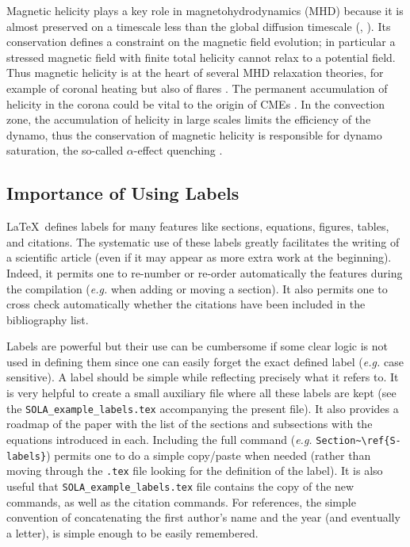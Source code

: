 \documentclass[namedreferences]{solarphysics}
\begin{document}
\begin{article}
Magnetic helicity plays a key role in magnetohydrodynamics (MHD)
because it is almost preserved on a timescale less than the global
diffusion timescale (\citealp{Berger84}, \citeyear{Berger03}).  
Its conservation defines a
constraint on the magnetic field evolution; in particular a
stressed magnetic field with finite total helicity cannot relax to
a potential field.  Thus magnetic helicity is at the heart of
several MHD relaxation theories, for example of coronal heating
\citep{Heyvaerts84} but also of flares \citep{Kusano04,Melrose04}.
The permanent accumulation of helicity in the corona could be
vital to the origin of CMEs \citep{Rust94,Low97}.  In the
convection zone, the accumulation of helicity in large scales
limits the efficiency of the dynamo, thus the conservation of
magnetic helicity is responsible for dynamo saturation, the
so-called $\alpha$-effect quenching \citep{Brandenburg01}.

\subsection{Importance of Using Labels} %
  \label{S-labels}

    \LaTeX\ defines labels for many features like sections, 
equations, figures, tables, and citations.  The systematic use
of these labels greatly facilitates the writing of a scientific
article (even if it may appear as more extra work at the beginning).
Indeed, it permits one to re-number or re-order automatically the
features during the compilation ({\it e.g.} when adding or moving a 
section).  It also permits one to
cross check automatically whether the citations have been included
in the bibliography list.

    Labels are powerful but their use can be cumbersome if some
clear logic is not used in defining them since one can easily
forget the exact defined label ({\it e.g.} case sensitive).
A label should be simple
while reflecting precisely what it refers to. It is very helpful
to create a small auxiliary file where all these labels are
kept (see the \verb+SOLA_example_labels.tex+ 
accompanying the present file).   
It also provides a roadmap of the paper with the list
of the sections and subsections with the equations introduced in each.     
Including the full command ({\it e.g.} \verb+Section~\ref{S-labels}+)
permits one to do a simple copy/paste when needed (rather than moving
through the \texttt{.tex} file looking for the definition of the label). 
It is also useful that  
\verb+SOLA_example_labels.tex+   file contains the copy of the 
new commands, as well as the citation commands. For references,
the simple convention of concatenating the first author's name and the year
(and eventually a letter), is simple enough to be easily remembered.
    

\end{article}
\end{document}
